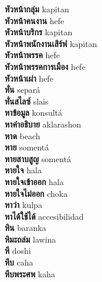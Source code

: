 \textbf{ หัวหน้ากลุ่ม  } kapitan \\
\textbf{ หัวหน้าคนงาน  } hefe \\
\textbf{ หัวหน้าบริกร  } kapitan \\
\textbf{ หัวหน้าพนักงานเสิร์ฟ  } kapitan \\
\textbf{ หัวหน้าพรรค  } hefe \\
\textbf{ หัวหน้าพรรคการเมือง  } hefe \\
\textbf{ หัวหน้าเผ่า  } hefe \\
\textbf{ หั่น  } separá \\
\textbf{ หั่นสไลซ์  } slais \\
\textbf{ หาข้อมูล  } konsultá \\
\textbf{ หาคำอธิบาย  } aklarashon \\
\textbf{ หาด  } beach \\
\textbf{ หาย  } somentá \\
\textbf{ หายสาบสูญ  } somentá \\
\textbf{ หายใจ  } hala \\
\textbf{ หายใจเข้าออก  } hala \\
\textbf{ หายใจไม่ออก  } choka \\
\textbf{ หาว่า  } kulpa \\
\textbf{ หาได้ใช้ได้  } accesibilidad \\
\textbf{ หิน  } baranka \\
\textbf{ หิมะถล่ม  } lawina \\
\textbf{ หี  } doshi \\
\textbf{ หีบ  } caha \\
\textbf{ หีบพระศพ  } kaha \\
